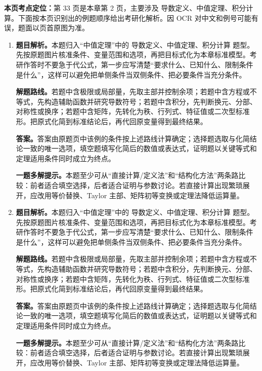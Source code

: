 \begin{solutionblock}
\textbf{本页考点定位：}第 33 页是本章第 2 页，主要涉及 导数定义、中值定理、积分计算。下面按本页识别出的例题顺序给出考研化解析。因 OCR 对中文和例号可能有误，题面以页首原图为准。

\begin{enumerate}[label=\textbf{例\arabic*.}, leftmargin=2.4em]

\item \textbf{题目解析。}本题归入“中值定理”中的 导数定义、中值定理、积分计算 题型。先按原题图片核准条件、变量范围和选项，再把目标式化为本章标准模型。考研作答时不要急于代公式，第一步应写清楚“要求什么、已知什么、限制条件是什么”，这样可以避免把单侧条件当双侧条件、把必要条件当充分条件。

\textbf{解题路线。}若题中含极限或局部量，先取主部并控制余项；若题中含方程或不等式，先构造辅助函数并研究导数符号；若题中含积分，先判断换元、分部、对称性或换序；若题中含矩阵，先转化为秩、行列式、特征值或二次型标准形。把原式化简到标准结论后，再代回原变量得到最终结果。

\textbf{答案。}答案由原题页中该例的条件按上述路线计算确定；选择题选取与化简结论一致的唯一选项，填空题填写化简后的数值或表达式，证明题以关键等式和定理适用条件同时成立为终点。

\textbf{一题多解提示。}本题至少可从“直接计算/定义法”和“结构化方法”两条路比较：前者适合填空选择，后者适合证明与参数讨论。若直接计算出现繁琐展开，应改用等价替换、Taylor 主部、矩阵初等变换或定理法降低运算量。

\item \textbf{题目解析。}本题归入“中值定理”中的 导数定义、中值定理、积分计算 题型。先按原题图片核准条件、变量范围和选项，再把目标式化为本章标准模型。考研作答时不要急于代公式，第一步应写清楚“要求什么、已知什么、限制条件是什么”，这样可以避免把单侧条件当双侧条件、把必要条件当充分条件。

\textbf{解题路线。}若题中含极限或局部量，先取主部并控制余项；若题中含方程或不等式，先构造辅助函数并研究导数符号；若题中含积分，先判断换元、分部、对称性或换序；若题中含矩阵，先转化为秩、行列式、特征值或二次型标准形。把原式化简到标准结论后，再代回原变量得到最终结果。

\textbf{答案。}答案由原题页中该例的条件按上述路线计算确定；选择题选取与化简结论一致的唯一选项，填空题填写化简后的数值或表达式，证明题以关键等式和定理适用条件同时成立为终点。

\textbf{一题多解提示。}本题至少可从“直接计算/定义法”和“结构化方法”两条路比较：前者适合填空选择，后者适合证明与参数讨论。若直接计算出现繁琐展开，应改用等价替换、Taylor 主部、矩阵初等变换或定理法降低运算量。

\end{enumerate}
\end{solutionblock}



